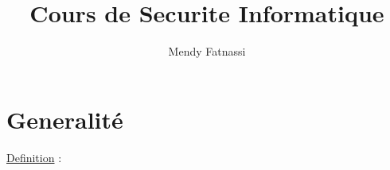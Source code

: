 \documentclass[a4paper,12pt,openany]{book}
\author{Mendy Fatnassi}
\title{Cours de Securite Informatique}
\begin{document}
\maketitle
\tableofcontents


\chapter{Generalité}
\underline{Definition} : \\




\chapter{}
\end{document}
